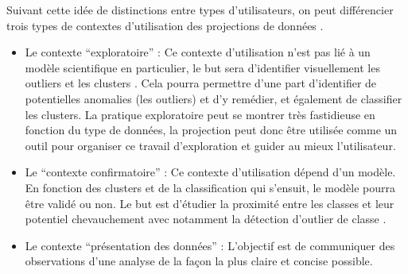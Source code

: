 \smallskip
Suivant cette idée de distinctions entre types d'utilisateurs, on peut différencier trois types de contextes d'utilisation des projections de données \cite{HeulotThese} . 

\begin{itemize}
    \item Le contexte “exploratoire” : 
    Ce contexte d’utilisation n’est pas lié à un modèle scientifique en particulier, le but sera d’identifier visuellement les outliers et les clusters . Cela pourra permettre d’une part d’identifier de potentielles anomalies (les outliers) et d’y remédier, et également de classifier les clusters. La pratique exploratoire peut se montrer très fastidieuse en fonction du type de données, la projection peut donc être utilisée comme un outil pour organiser ce travail d’exploration et guider au mieux l’utilisateur.
    \item Le “contexte confirmatoire” : 
    Ce contexte d’utilisation dépend d’un modèle. En fonction des clusters et de la classification qui s'ensuit, le modèle pourra être validé ou non. Le but est d'étudier la proximité entre les classes et leur potentiel chevauchement avec notamment la détection d’outlier de classe \cite{HeulotThese} \cite{hetlerovicdetekce-OUTLIER-Thesis}.
    \item Le contexte “présentation des données” : 
    L’objectif est de communiquer des observations d’une analyse de la façon la plus claire et concise possible.           
\end{itemize}
\smallskip

